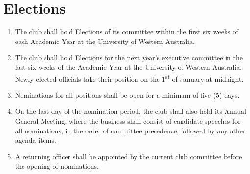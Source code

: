 \documentclass[10pt,a4paper]{report}
\begin{document}
	\section{Elections}
	\begin{enumerate}[label=\alph*]
		
		\item The club shall hold Elections of its committee within the first six weeks of each Academic Year at the University of Western Australia.
		
		\item The club shall hold Elections for the next year's executive committee in the last six weeks of the Academic Year at the University of Western Australia. Newly elected officials take their position on the 1\textsuperscript{st} of January at midnight.
		
		\item Nominations for all positions shall be open for a minimum of five (5) days.
		
		\item On the last day of the nomination period, the club shall also hold its Annual General Meeting, where the business shall consist of candidate speeches for all nominations, in the order of committee precedence, followed by any other agenda items.
		
		\item A returning officer shall be appointed by the current club committee before the opening of nominations.
		
	\end{enumerate}
\end{document}
